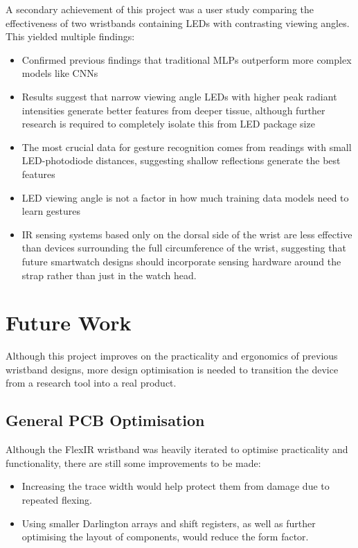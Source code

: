 \documentclass[ oneside,%
                    author={Jack Jarvis},
                    degree={BSc},
                     title={FlexIR: Flexible PCB Wristbands for Infrared Based Gesture Recognition},
                    unit={COMS30045},
                    subtitle={Investigating the Effect of LED Viewing Angle on Gesture Classification in Infrared Sensing Systems}]{dissertation}
\begin{document}
A secondary achievement of this project was a user study comparing the effectiveness of two wristbands containing LEDs with contrasting viewing angles. This yielded multiple findings:

\begin{itemize}
    \item Confirmed previous findings that traditional MLPs outperform more complex models like CNNs
    \item Results suggest that narrow viewing angle LEDs with higher peak radiant intensities generate better features from deeper tissue, although further research is required to completely isolate this from LED package size
    \item The most crucial data for gesture recognition comes from readings with small LED-photodiode distances, suggesting shallow reflections generate the best features
    \item LED viewing angle is not a factor in how much training data models need to learn gestures
    \item IR sensing systems based only on the dorsal side of the wrist are less effective than devices surrounding the full circumference of the wrist, suggesting that future smartwatch designs should incorporate sensing hardware around the strap rather than just in the watch head.
\end{itemize}

\section{Future Work}

Although this project improves on the practicality and ergonomics of previous wristband designs, more design optimisation is needed to transition the device from a research tool into a real product.

\subsection{General PCB Optimisation}
Although the FlexIR wristband was heavily iterated to optimise practicality and functionality, there are still some improvements to be made:
\begin{itemize}
    \item Increasing the trace width would help protect them from damage due to repeated flexing.
    \item Using smaller Darlington arrays and shift registers, as well as further optimising the layout of components, would reduce the form factor.
\end{itemize}
\end{document}
